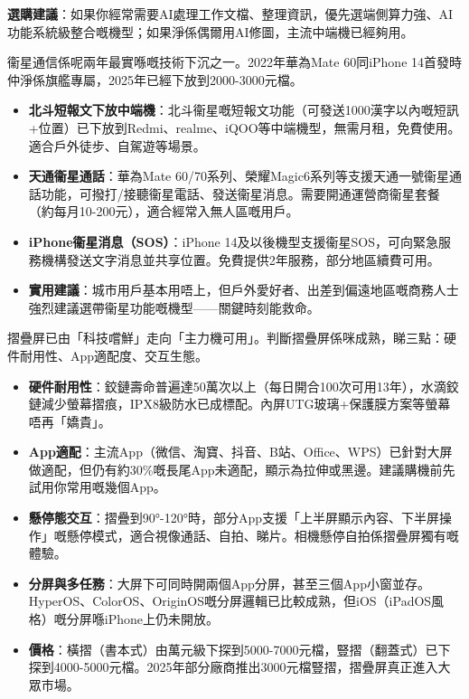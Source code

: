 \textbf{選購建議}：如果你經常需要AI處理工作文檔、整理資訊，優先選端側算力強、AI功能系統級整合嘅機型；如果淨係偶爾用AI修圖，主流中端機已經夠用。


衞星通信係呢兩年最實喺嘅技術下沉之一。2022年華為Mate 60同iPhone 14首發時仲淨係旗艦專屬，2025年已經下放到2000-3000元檔。

\begin{itemize}
  \item \textbf{北斗短報文下放中端機}：北斗衞星嘅短報文功能（可發送1000漢字以內嘅短訊+位置）已下放到Redmi、realme、iQOO等中端機型，無需月租，免費使用。適合戶外徒步、自駕遊等場景。
  \item \textbf{天通衞星通話}：華為Mate 60/70系列、榮耀Magic6系列等支援天通一號衞星通話功能，可撥打/接聽衞星電話、發送衞星消息。需要開通運營商衞星套餐（約每月10-200元），適合經常入無人區嘅用戶。
  \item \textbf{iPhone衞星消息（SOS）}：iPhone 14及以後機型支援衞星SOS，可向緊急服務機構發送文字消息並共享位置。免費提供2年服務，部分地區續費可用。
  \item \textbf{實用建議}：城市用戶基本用唔上，但戶外愛好者、出差到偏遠地區嘅商務人士強烈建議選帶衞星功能嘅機型——關鍵時刻能救命。
\end{itemize}


摺疊屏已由「科技嚐鮮」走向「主力機可用」。判斷摺疊屏係咪成熟，睇三點：硬件耐用性、App適配度、交互生態。

\begin{itemize}
  \item \textbf{硬件耐用性}：鉸鏈壽命普遍達50萬次以上（每日開合100次可用13年），水滴鉸鏈減少螢幕摺痕，IPX8級防水已成標配。內屏UTG玻璃+保護膜方案等螢幕唔再「嬌貴」。
  \item \textbf{App適配}：主流App（微信、淘寶、抖音、B站、Office、WPS）已針對大屏做適配，但仍有約30\%嘅長尾App未適配，顯示為拉伸或黑邊。建議購機前先試用你常用嘅幾個App。
  \item \textbf{懸停態交互}：摺疊到90°-120°時，部分App支援「上半屏顯示內容、下半屏操作」嘅懸停模式，適合視像通話、自拍、睇片。相機懸停自拍係摺疊屏獨有嘅體驗。
  \item \textbf{分屏與多任務}：大屏下可同時開兩個App分屏，甚至三個App小窗並存。HyperOS、ColorOS、OriginOS嘅分屏邏輯已比較成熟，但iOS（iPadOS風格）嘅分屏喺iPhone上仍未開放。
  \item \textbf{價格}：橫摺（書本式）由萬元級下探到5000-7000元檔，豎摺（翻蓋式）已下探到4000-5000元檔。2025年部分廠商推出3000元檔豎摺，摺疊屏真正進入大眾市場。
\end{itemize}

